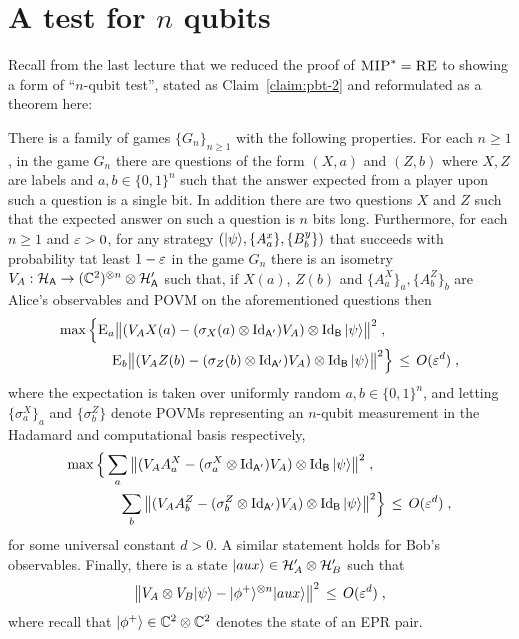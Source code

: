 \chapter{A test for $n$ qubits}

Recall from the last lecture that we reduced the proof of $\textsc{MIP}^*=\textsc{RE}$ to showing a form of ``$n$-qubit test'', stated as Claim~\ref{claim:pbt-2} and reformulated as a theorem here:

\begin{theorem}\label{thm:pbt}
There is a family of games $\{G_n\}_{n\geq 1}$ with the following properties. For each $n\geq 1$, in the game $G_n$ there are questions of the form $(X,a)$ and $(Z,b)$ where $X,Z$ are labels and $a,b\in\{0,1\}^n$ such that the answer expected from a player upon such a question is a single bit. In addition there are two questions $X$ and $Z$ such that the expected answer on such a question is $n$ bits long. Furthermore, for each $n\geq 1$ and $\varepsilon>0$, for any strategy $(|\psi\rangle,\{A^x_a\},\{B^y_b\})$ that succeeds with probability tat least $1-\varepsilon$ in the game $G_n$ there is an isometry $V_A:\mathcal{H}_{\textsf{A}} \to (\mathbb{C}^2)^{\otimes n} \otimes \mathcal{H}'_{{\textsf{A}}}$ such that, if $X(a)$, $Z(b)$ and $\{A^X_a\}_a,\{A^Z_b\}_b$ are Alice's observables and POVM on the aforementioned questions then 
\begin{align}
 \max\Big\{&\textsc{E}_{a} \big\| (V_A X(a) - (\sigma_X(a)\otimes \mathop{\rm Id}\nolimits_{{\textsf{A}}'}) V_A )\otimes \mathop{\rm Id}\nolimits_{\textsf{B}} |\psi\rangle \big\|^2\;,\notag\\
&\quad \textsc{E}_{b}\big\| (V_A Z(b) - (\sigma_Z(b)\otimes \mathop{\rm Id}\nolimits_{{\textsf{A}}'}) V_A )\otimes \mathop{\rm Id}\nolimits_{\textsf{B}} |\psi\rangle \big\|^2 \Big\} \,\leq\, O(\varepsilon^d)\;,\label{eq:pbt-obs}
\end{align}
where the expectation is taken over uniformly random $a,b\in\{0,1\}^n$, and letting $\{\sigma^X_a\}_a$ and $\{\sigma^Z_b\}$ denote POVMs representing an $n$-qubit measurement in the Hadamard and computational basis respectively,
\begin{align}
 \max\Big\{& \sum_a \big\| (V_A A^X_a  - (\sigma^X_a\otimes \mathop{\rm Id}\nolimits_{{\textsf{A}}'}) V_A )\otimes \mathop{\rm Id}\nolimits_{{\textsf{B}}}|\psi\rangle \big\|^2 \;,\notag\\
&\quad  \sum_b \big\| (V_A A^Z_b  - (\sigma^Z_b\otimes \mathop{\rm Id}\nolimits_{{\textsf{A}}'}) V_A )\otimes \mathop{\rm Id}\nolimits_{{\textsf{B}}}|\psi\rangle \big\|^2 \Big\} \,\leq\, O(\varepsilon^d)\;,\label{eq:pbt-meas}
\end{align}
for some universal constant $d>0$. A similar statement holds for Bob's observables. Finally, there is a state $|aux\rangle \in \mathcal{H}'_A \otimes \mathcal{H}'_B$ such that 
\begin{equation}\label{eq:pbt-state}
 \big\| V_A \otimes V_B |\psi\rangle - |\phi^+\rangle^{\otimes n} |aux\rangle \big\|^2 \,\leq\, O(\varepsilon^d)\;,
\end{equation}
where recall that $|\phi^+\rangle \in \mathbb{C}^2 \otimes \mathbb{C}^2$ denotes the state of an EPR pair. 
\end{theorem}

